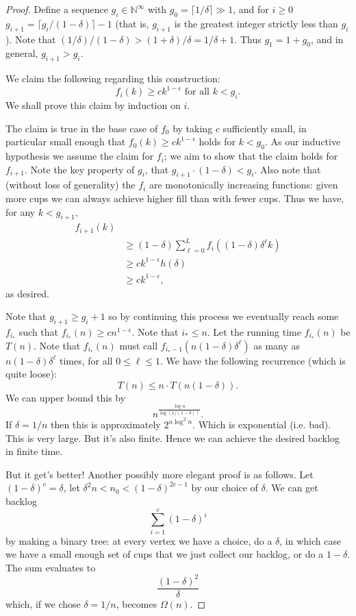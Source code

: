 \documentclass[twocolumn]{article}[11pt]
\begin{document}
\begin{proof}
  Define a sequence $g_i \in \mathbb{N}^\infty$ with $g_0 = \lceil 1/\delta
  \rceil \gg 1$, and for $i\ge0$ $g_{i+1} =\lceil g_i/(1-\delta)\rceil -1$
  (that is, $g_{i+1}$ is the greatest integer strictly less than $g_i$).
  Note that $ (1/\delta) / (1-\delta) > (1+\delta)/\delta = 1/\delta + 1.$
  Thus $g_1 = 1+ g_0$, and in general, $g_{i+1} > g_i$.

  We claim the following regarding this construction:
  $$f_i(k) \ge ck^{1-\epsilon} \text{ for all } k < g_i.$$
  We shall prove this claim by induction on $i$.

  The claim is true in the base case of $f_0$ by taking $c$ sufficiently small,
  in particular small enough that $f_0(k) \ge ck^{1-\epsilon}$ holds for $k < g_0$.
  As our inductive hypothesis we assume the claim for $f_i$; we aim to show that
  the claim holds for $f_{i+1}$.
  Note the key property of $g_i$, that $g_{i+1}\cdot(1-\delta) < g_i$. Also
  note that (without loss of generality) the $f_i$ are monotonically increasing
  functions: given more cups we can always achieve higher fill than with fewer
  cups.
  Thus we have, for any $k<g_{i+1}$,
  \begin{align*}
    f_{i+1}(k) &\\
    &\ge (1-\delta)\sum_{\ell=0}^L f_i((1-\delta)\delta^\ell k)\\
    &\ge ck^{1-\epsilon}h(\delta)\\
    &\ge ck^{1-\epsilon},
  \end{align*}
  as desired. 

  Note that $g_{i+1} \ge g_i + 1$ so by continuing this process we eventually
  reach some $f_{i_*}$ such that $f_{i_*}(n) \ge cn^{1-\epsilon}$.
  Note that $i_* \le n$.
  Let the running time $f_{i_*}(n)$ be $T(n)$.
  Note that $f_{i_*}(n)$ must call $f_{i_*-1}(n(1-\delta)\delta^\ell)$ as many
  as $n(1-\delta)\delta^\ell$ times, for all $0 \le \ell\le 1$.
  We have the following recurrence (which is quite loose):
  $$T(n) \le n \cdot T(n(1-\delta)).$$
  We can upper bound this by
  $$n^{\frac{\log n}{\log (1/(1-\delta))}}.$$
  {\color{red} 
    If $\delta = 1/n$ then this is approximately $2^{n\log^2 n}$. Which is exponential (i.e. bad).
    This is very large. But it's also finite. Hence we can achieve the desired backlog in finite time.
  }

  {\color{blue}But it get's better! 
    Another possibly more elegant proof is as follows.
    Let $(1-\delta)^c = \delta$, let $\delta^2 n < n_0 < (1-\delta)^{2c-1}$ by our choice of $\delta$.
    We can get backlog 
    $$\sum_{i=1}^c (1-\delta)^i $$
    by making a binary tree: at every vertex we have a choice, do a $\delta$,
    in which case we have a small enough set of cups that we just collect our
    backlog, or do a $1-\delta$.
    The sum evaluates to 
    $$\frac{(1-\delta)^2}{\delta}$$
    which, if we chose $\delta = 1/n$, becomes $\Omega(n)$.

}
\end{proof}
\end{document}
